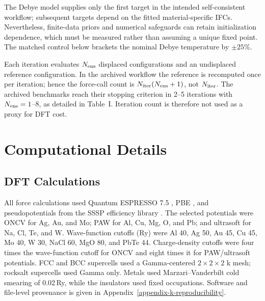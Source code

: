 \documentclass[aps,prb,reprint,amsmath,amssymb,floatfix]{revtex4-2}
\begin{document}
The Debye model supplies only the first target in the intended
self-consistent workflow; subsequent targets depend on the fitted
material-specific IFCs. Nevertheless, finite-data priors and numerical
safeguards can retain initialization dependence, which must be measured rather
than assuming a unique fixed point. The matched control below brackets the
nominal Debye temperature by $\pm25\%$.

Each iteration evaluates \(N_{\rm ens}\) displaced configurations and an
undisplaced reference configuration. In the archived workflow the
reference is recomputed once per iteration; hence the force-call count is
\(N_{\rm iter}(N_{\rm ens}+1)\), not \(N_{\rm iter}\). The archived benchmarks
reach their stopping criterion in 2--5 iterations with
\(N_{\rm ens}=1\)--8, as detailed in Table~I. Iteration count is therefore not
used as a proxy for DFT cost.

\section{Computational Details}\label{computational-details}

\subsection{DFT Calculations}\label{dft-calculations}

All force calculations used Quantum ESPRESSO 7.5 \cite{ref46}, PBE
\cite{ref17}, and pseudopotentials from the SSSP efficiency library
\cite{ref47}. The selected potentials were ONCV for Ag, Au, and Mo; PAW for
Al, Cu, Mg, O, and Pb; and ultrasoft for Na, Cl, Te, and W. Wave-function
cutoffs (Ry) were Al 40, Ag 50, Au 45, Cu 45, Mo 40, W 30, NaCl 60,
MgO 80, and PbTe 44. Charge-density cutoffs were four times the
wave-function cutoff for ONCV and eight times it for PAW/ultrasoft
potentials. FCC and BCC supercells used a Gamma-centered
\(2\times2\times2\) k mesh; rocksalt supercells used Gamma only. Metals used
Marzari--Vanderbilt cold smearing \cite{ref18} of 0.02\,Ry, while the
insulators used fixed occupations. Software and file-level provenance is given in
Appendix~\ref{appendix-k-reproducibility}.
\end{document}
